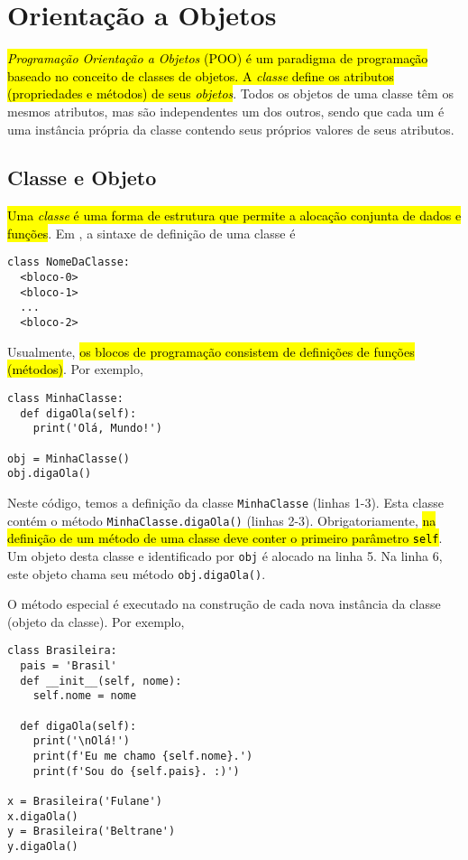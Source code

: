 \chapter{Orientação a Objetos}\label{cap_poo}

\hl{\emph{Programação Orientação a Objetos} (POO) é um paradigma de programação baseado no conceito de classes de objetos. A \emph{classe} define os atributos (propriedades e métodos) de seus \emph{objetos}}. Todos os objetos de uma classe têm os mesmos atributos, mas são independentes um dos outros, sendo que cada um é uma instância própria da classe contendo seus próprios valores de seus atributos.

\section{Classe e Objeto}\label{cap_ob_sec_class}

\hl{Uma \emph{classe} é uma forma de estrutura que permite a alocação conjunta de dados e funções}. Em {\python}, a sintaxe de definição de uma classe é

\begin{lstlisting}
class NomeDaClasse:
  <bloco-0>
  <bloco-1>
  ...
  <bloco-2>
\end{lstlisting}

Usualmente, \hl{os blocos de programação consistem de definições de funções (métodos)}. Por exemplo,

\begin{lstlisting}
class MinhaClasse:
  def digaOla(self):
    print('Olá, Mundo!')

obj = MinhaClasse()
obj.digaOla()
\end{lstlisting}

Neste código, temos a definição da classe \lstinline+MinhaClasse+ (linhas 1-3). Esta classe contém o método \lstinline+MinhaClasse.digaOla()+ (linhas 2-3). Obrigatoriamente, \hl{na definição de um método de uma classe deve conter o primeiro parâmetro \texttt{self}}. Um objeto desta classe e identificado por \lstinline+obj+ é alocado na linha 5. Na linha 6, este objeto chama seu método \lstinline+obj.digaOla()+.

O método especial {\PYTHONobjectDOTinit} é executado na construção de cada nova instância da classe (objeto da classe). Por exemplo,

\begin{lstlisting}
class Brasileira:
  pais = 'Brasil'
  def __init__(self, nome):
    self.nome = nome
      
  def digaOla(self):
    print('\nOlá!')
    print(f'Eu me chamo {self.nome}.')
    print(f'Sou do {self.pais}. :)')

x = Brasileira('Fulane')
x.digaOla()
y = Brasileira('Beltrane')
y.digaOla()
\end{lstlisting}

